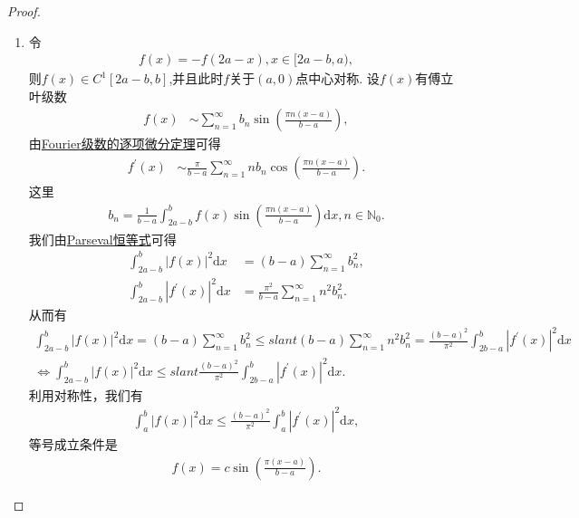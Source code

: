 \documentclass[../../main.tex]{subfiles}
\begin{document}
\begin{proof}
\begin{enumerate}[(1)]
\item 令
\begin{align*}
f(x)=-f(2a - x), x\in[2a - b,a),
\end{align*}
则$f(x)\in C^1[2a - b,b]$,并且此时$f$关于$(a,0)$点中心对称.
设$f(x)$有傅立叶级数
\begin{align*}
f(x) &\sim \sum_{n = 1}^{\infty}b_n\sin\left(\frac{\pi n(x - a)}{b - a}\right),
\end{align*}
由\hyperref[theorem:Fourier级数的逐项微分定理]{Fourier级数的逐项微分定理}可得
\begin{align*}
f^{\prime}(x) &\sim \frac{\pi}{b - a}\sum_{n = 1}^{\infty}nb_n\cos\left(\frac{\pi n(x - a)}{b - a}\right).
\end{align*}
这里
\begin{align*}
b_n=\frac{1}{b - a}\int_{2a - b}^{b}f(x)\sin\left(\frac{\pi n(x - a)}{b - a}\right)\mathrm{d}x, n\in\mathbb{N}_0.
\end{align*}
我们由\hyperref[theorem:Parseval恒等式]{Parseval恒等式}可得
\begin{align*}
\int_{2a - b}^{b}|f(x)|^2\mathrm{d}x&=(b - a)\sum_{n = 1}^{\infty}b_n^2,\\
\int_{2a - b}^{b}|f^{\prime}(x)|^2\mathrm{d}x&=\frac{\pi^2}{b - a}\sum_{n = 1}^{\infty}n^2b_n^2.
\end{align*}
从而有
\begin{gather*}
\int_{2a-b}^b{|f(x)|^2\mathrm{d}x}=\left( b-a \right) \sum_{n=1}^{\infty}{b_{n}^{2}}\leqslant slant \left( b-a \right) \sum_{n=1}^{\infty}{n^2b_{n}^{2}}=\frac{(b-a)^2}{\pi ^2}\int_{2b-a}^b{|f^{\prime}(x)|^2\mathrm{d}x}
\\
\Longleftrightarrow \int_{2a-b}^b{|f(x)|^2\mathrm{d}x}\leqslant slant \frac{(b-a)^2}{\pi ^2}\int_{2b-a}^b{|f^{\prime}(x)|^2\mathrm{d}x}.
\end{gather*}
利用对称性，我们有
\begin{align*}
\int_{a}^{b}|f(x)|^2\mathrm{d}x\leqslant \frac{(b - a)^2}{\pi^2}\int_{a}^{b}|f^{\prime}(x)|^2\mathrm{d}x,
\end{align*}
等号成立条件是
\begin{align*}
f(x)=c\sin\left(\frac{\pi(x - a)}{b - a}\right).
\end{align*} 
\end{enumerate}
\end{proof}
\end{document}
